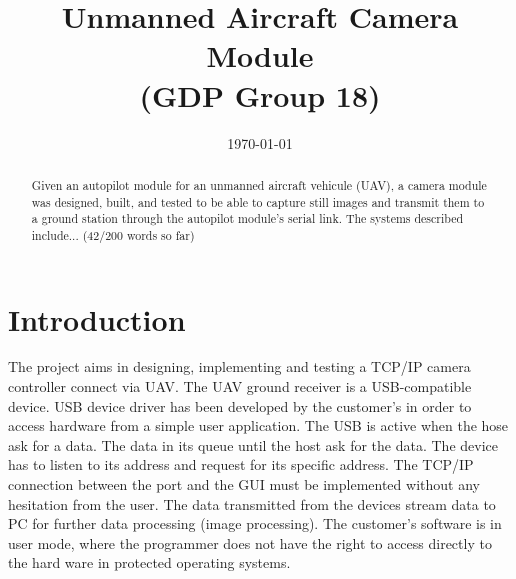 \documentclass[oneside]{ecsgdp}         %
\begin{document}
\frontmatter
\title      {Unmanned Aircraft Camera Module \\(GDP Group 18)}
\date       {\today}
\subject    {ELEC6050 Group Design Project}
\maketitle
\begin{abstract}
Given an autopilot module for an unmanned aircraft vehicule (UAV), a camera module was designed, built, and tested to be able to capture still images and transmit them to a ground station through the autopilot module's serial link. The systems described include... (42/200 words so far)
\end{abstract}
\tableofcontents
\listoffigures
\listoftables
\lstlistoflistings
{}
\mainmatter

\chapter{Introduction}
The project aims in designing, implementing and testing a TCP/IP camera controller connect via UAV. The UAV ground receiver is a USB-compatible device. USB device driver has been developed by the customer’s in order to access hardware from a simple user application. The USB is active when the hose ask for a data. The data in its queue until the host ask for the data. The device has to listen to its address and request for its specific address. The TCP/IP connection between the port and the GUI must be implemented without any hesitation from the user. The data transmitted from the devices stream data to PC for further data processing (image processing).  The customer’s software is in user mode, where the programmer does not have the right to access directly to the hard ware in protected operating systems. 
\end{document}
